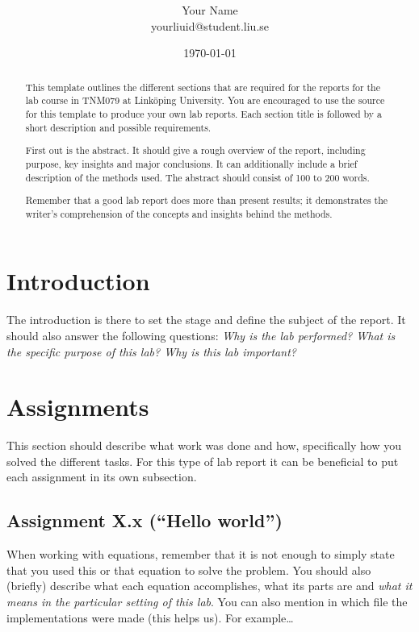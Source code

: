 \documentclass[onecolumn]{article}
\title{\spacecaps{Lab report: Lab 0 }\\ \normalsize \spacesc{TNM079, Modeling and Animation} }
\author{Your Name\\yourliuid@student.liu.se}
\date{\today}
\begin{document}
\maketitle

\begin{abstract}
This template outlines the different sections that are required for the reports for the lab course in TNM079 at Linköping University. You are encouraged to use the source for this template to produce your own lab reports. Each section title is followed by a short description and possible requirements.

First out is the abstract. It should give a rough overview of the report, including purpose, key insights and major conclusions. It can additionally include a brief description of the methods used. The abstract should consist of 100 to 200 words.

Remember that a good lab report does more than present results; it demonstrates the writer's comprehension of the concepts and insights behind the methods.
\end{abstract}


\section{Introduction}
The introduction is there to set the stage and define the subject of the report. It should also answer the following questions: \emph{Why is the lab performed? What is the specific purpose of this lab? Why is this lab important?}

\section{Assignments}
This section should describe what work was done and how, specifically how you solved the different tasks. For this type of lab report it can be beneficial to put each assignment in its own subsection.

\subsection{Assignment X.x (``Hello world'')}

When working with equations, remember that it is not enough to simply state that you used this or that equation to solve the problem. You should also (briefly) describe what each equation accomplishes, what its parts are and \emph{what it means in the particular setting of this lab}. You can also mention in which file the implementations were made (this helps us). For example\dots
\end{document}
